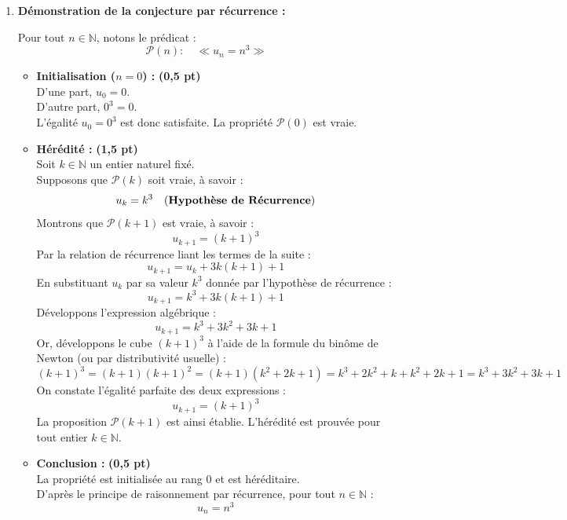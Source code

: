 \documentclass[11pt,a4paper]{article}
\newcommand{\bareme}[1]{\hfill\textbf{\textcolor{secondary}{\sffamily[#1]}}}
\newcommand{\pts}[1]{\textbf{\textcolor{secondary}{\sffamily(#1)}}}
\newcommand{\N}{\mathbb{N}}
\begin{document}
\begin{correctionbox}[Corrigé de l'Exercice 3 \bareme{Total : 4 points}]
\begin{enumerate}[label=\textbf{\arabic*.}]
    \item \textbf{Démonstration de la conjecture par récurrence :} \bareme{2,5 pts}

    Pour tout $n \in \N$, notons le prédicat :
    \[
    \mathcal{P}(n) : \quad \ll u_n = n^3 \gg
    \]

    \begin{itemize}[leftmargin=*, label=$\bullet$]
        \item \textbf{Initialisation ($n = 0$) :} \pts{0,5 pt}\\
        D'une part, $u_0 = 0$.\\
        D'autre part, $0^3 = 0$.\\
        L'égalité $u_0 = 0^3$ est donc satisfaite. La propriété $\mathcal{P}(0)$ est vraie.

        \item \textbf{Hérédité :} \pts{1,5 pt}\\
        Soit $k \in \N$ un entier naturel fixé.\\
        Supposons que $\mathcal{P}(k)$ soit vraie, à savoir :
        \[
        u_k = k^3 \quad \text{(\textbf{Hypothèse de Récurrence})}
        \]
        Montrons que $\mathcal{P}(k+1)$ est vraie, à savoir :
        \[
        u_{k+1} = (k+1)^3
        \]
        Par la relation de récurrence liant les termes de la suite :
        \[
        u_{k+1} = u_k + 3k(k+1) + 1
        \]
        En substituant $u_k$ par sa valeur $k^3$ donnée par l'hypothèse de récurrence :
        \[
        u_{k+1} = k^3 + 3k(k+1) + 1
        \]
        Développons l'expression algébrique :
        \[
        u_{k+1} = k^3 + 3k^2 + 3k + 1
        \]
        Or, développons le cube $(k+1)^3$ à l'aide de la formule du binôme de Newton (ou par distributivité usuelle) :
        \[
        (k+1)^3 = (k+1)(k+1)^2 = (k+1)(k^2 + 2k + 1) = k^3 + 2k^2 + k + k^2 + 2k + 1 = k^3 + 3k^2 + 3k + 1
        \]
        On constate l'égalité parfaite des deux expressions :
        \[
        u_{k+1} = (k+1)^3
        \]
        La proposition $\mathcal{P}(k+1)$ est ainsi établie. L'hérédité est prouvée pour tout entier $k \in \N$.

        \item \textbf{Conclusion :} \pts{0,5 pt}\\
        La propriété est initialisée au rang $0$ et est héréditaire.\\
        D'après le principe de raisonnement par récurrence, pour tout $n \in \N$ :
        \[
        u_n = n^3
        \]
    \end{itemize}
\end{enumerate}
\end{correctionbox}
\end{document}
